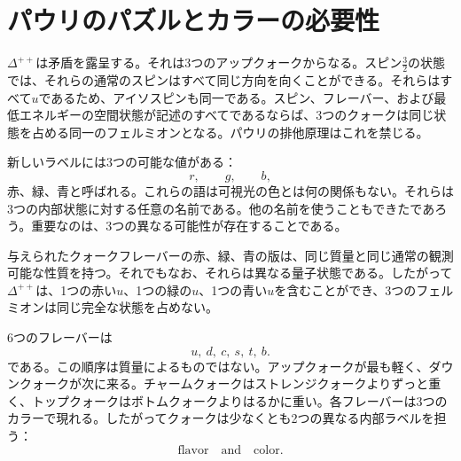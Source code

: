 \begin{classroomqa}
\end{classroomqa}

\section{パウリのパズルとカラーの必要性}

\(\Delta^{++}\)は矛盾を露呈する。それは3つのアップクォークからなる。スピン\(\tfrac32\)の状態では、それらの通常のスピンはすべて同じ方向を向くことができる。それらはすべて\(u\)であるため、アイソスピンも同一である。スピン、フレーバー、および最低エネルギーの空間状態が記述のすべてであるならば、3つのクォークは同じ状態を占める同一のフェルミオンとなる。パウリの排他原理はこれを禁じる。

\begin{classroomqa}
\end{classroomqa}

新しいラベルには3つの可能な値がある：
\begin{equation}
r,\qquad g,\qquad b,
\end{equation}
赤、緑、青と呼ばれる。これらの語は可視光の色とは何の関係もない。それらは3つの内部状態に対する任意の名前である。他の名前を使うこともできたであろう。重要なのは、3つの異なる可能性が存在することである。

与えられたクォークフレーバーの赤、緑、青の版は、同じ質量と同じ通常の観測可能な性質を持つ。それでもなお、それらは異なる量子状態である。したがって\(\Delta^{++}\)は、1つの赤い\(u\)、1つの緑の\(u\)、1つの青い\(u\)を含むことができ、3つのフェルミオンは同じ完全な状態を占めない。

6つのフレーバーは
\begin{equation}
u,\ d,\ c,\ s,\ t,\ b.
\end{equation}
である。この順序は質量によるものではない。アップクォークが最も軽く、ダウンクォークが次に来る。チャームクォークはストレンジクォークよりずっと重く、トップクォークはボトムクォークよりはるかに重い。各フレーバーは3つのカラーで現れる。したがってクォークは少なくとも2つの異なる内部ラベルを担う：
\begin{equation}
\text{flavor}\quad\text{and}\quad\text{color}.
\end{equation}

